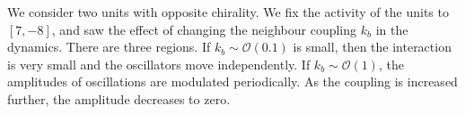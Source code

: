 \documentclass[11pt, a4paper]{article} %
\newcommand{\bigO}{\mathcal{O}}
\begin{document}







We consider two units with opposite chirality. We fix the activity of the units to $[7, -8]$, 
and saw the effect of changing the neighbour coupling $k_b$ in the dynamics. There are three regions. If 
$k_b \sim \bigO(0.1)$ is small, then the interaction is very small and the oscillators move independently. If $k_b \sim \bigO(1)$, 
the amplitudes of oscillations are modulated periodically. As the coupling is increased further, the amplitude 
decreases to zero. 
\end{document}
